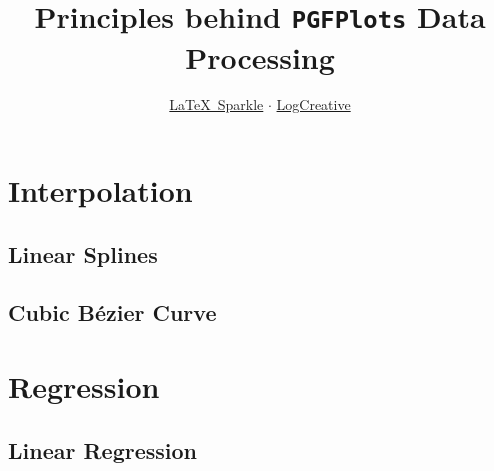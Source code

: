 \documentclass[a4paper,12pt]{article}
\title{Principles behind \texttt{PGFPlots} Data Processing}
\author{\href{https://logcreative.github.io/LaTeXSparkle/index.html}{\LaTeX\ Sparkle} $\cdot$ \href{https://space.bilibili.com/31271993}{LogCreative}}
\date{}
\begin{document}
\begin{CJK}{UTF8}{song} %

\maketitle

\section{Interpolation}
\subsection{Linear Splines}
\subsection{Cubic Bézier Curve}

\section{Regression}
\subsection{Linear Regression}



\end{CJK}
\end{document}
